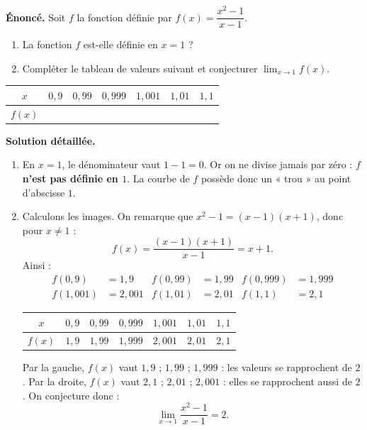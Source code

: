 \documentclass[11pt]{article}
\begin{document}
\begin{exoresolu}
\textbf{Énoncé.} Soit $f$ la fonction définie par $f(x) = \dfrac{x^2 - 1}{x - 1}$.
\begin{enumerate}
\item La fonction $f$ est-elle définie en $x = 1$ ?
\item Compléter le tableau de valeurs suivant et conjecturer $\displaystyle\lim_{x \to 1} f(x)$.
\end{enumerate}
\begin{center}
\begin{tabular}{|c|c|c|c|c|c|c|}
\hline
\rowcolor{popblueL} $x$ & $0{,}9$ & $0{,}99$ & $0{,}999$ & $1{,}001$ & $1{,}01$ & $1{,}1$ \\
\hline $f(x)$ & & & & & & \\
\hline
\end{tabular}
\end{center}
\tcblower
\textbf{Solution détaillée.}
\begin{enumerate}
\item En $x = 1$, le dénominateur vaut $1 - 1 = 0$. Or on ne divise jamais par zéro : $f$ \textbf{n'est pas définie en $1$}. La courbe de $f$ possède donc un « trou » au point d'abscisse $1$.
\item Calculons les images. On remarque que $x^2 - 1 = (x-1)(x+1)$, donc pour $x \neq 1$ :
\[ f(x) = \frac{(x-1)(x+1)}{x-1} = x + 1. \]
Ainsi :
\begin{align*}
f(0{,}9) &= 1{,}9 & f(0{,}99) &= 1{,}99 & f(0{,}999) &= 1{,}999 \\
f(1{,}001) &= 2{,}001 & f(1{,}01) &= 2{,}01 & f(1{,}1) &= 2{,}1
\end{align*}
\begin{center}
\begin{tabular}{|c|c|c|c|c|c|c|}
\hline
\rowcolor{popblueL} $x$ & $0{,}9$ & $0{,}99$ & $0{,}999$ & $1{,}001$ & $1{,}01$ & $1{,}1$ \\
\hline $f(x)$ & $1{,}9$ & $1{,}99$ & $1{,}999$ & $2{,}001$ & $2{,}01$ & $2{,}1$ \\
\hline
\end{tabular}
\end{center}
Par la gauche, $f(x)$ vaut $1{,}9$ ; $1{,}99$ ; $1{,}999$ : les valeurs se rapprochent de $2$. Par la droite, $f(x)$ vaut $2{,}1$ ; $2{,}01$ ; $2{,}001$ : elles se rapprochent aussi de $2$. On conjecture donc :
\[ \lim_{x \to 1} \frac{x^2 - 1}{x - 1} = 2. \]
\end{enumerate}
\end{exoresolu}
\end{document}
